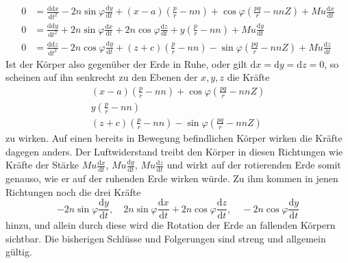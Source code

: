 \[
\begin{aligned}
0&=\tfrac{\mathrm{dd}x}{\mathrm{d}t^2}-2n\sin\varphi\tfrac{\mathrm{d}y}{\mathrm{d}t}+(x-a)(\tfrac pr-nn)+\cos\varphi(\tfrac{pq}{r}-nnZ)+Mu\tfrac{\mathrm{d}x}{\mathrm{d}t}\\
0&=\tfrac{\mathrm{dd}y}{\mathrm{d}t^2}+2n\sin\varphi\tfrac{\mathrm{d}x}{\mathrm{d}t}+2n\cos\varphi\tfrac{\mathrm{d}z}{\mathrm{d}t}+y(\tfrac pr-nn)+Mu\tfrac{\mathrm{d}y}{\mathrm{d}t}\\
0&=\tfrac{\mathrm{dd}z}{\mathrm{d}t^2}-2n\cos\varphi\tfrac{\mathrm{d}y}{\mathrm{d}t}+(z+c)(\tfrac pr-nn)-\sin\varphi(\tfrac{pq}{r}-nnZ)+Mu\tfrac{\mathrm{d}z}{\mathrm{d}t}
\end{aligned}
\]
Ist der Körper also gegenüber der Erde in Ruhe, oder gilt $\mathrm{d}x=\mathrm{d}y=\mathrm{d}z=0$, so scheinen auf ihn senkrecht zu den Ebenen der $x,y,z$ die Kräfte
\[
\begin{gathered}
(x-a)(\tfrac pr-nn)+\cos\varphi(\tfrac{pq}{r}-nnZ)\\
y(\tfrac pr-nn)\\
(z+c)(\tfrac pr-nn)-\sin\varphi(\tfrac{pq}{r}-nnZ)
\end{gathered}
\]
zu wirken. Auf einen bereits in Bewegung befindlichen Körper wirken die Kräfte dagegen anders. Der Luftwiderstand treibt den Körper in diesen Richtungen wie Kräfte der Stärke $Mu\tfrac{\mathrm{d}x}{\mathrm{d}t}$, $Mu\tfrac{\mathrm{d}y}{\mathrm{d}t}$, $Mu\tfrac{\mathrm{d}z}{\mathrm{d}t}$ und wirkt auf der rotierenden Erde somit genauso, wie er auf der ruhenden Erde wirken würde. Zu ihm kommen in jenen Richtungen noch die drei Kräfte
\[
-2n\sin\varphi\frac{\mathrm{d}y}{\mathrm{d}t},\quad 2n\sin\varphi\frac{\mathrm{d}x}{\mathrm{d}t}+2n\cos\varphi\frac{\mathrm{d}z}{\mathrm{d}t},\quad -2n\cos\varphi\frac{\mathrm{d}y}{\mathrm{d}t}
\]
hinzu, und allein durch diese wird die Rotation der Erde an fallenden Körpern sichtbar. Die bisherigen Schlüsse und Folgerungen sind streng und allgemein gültig.

